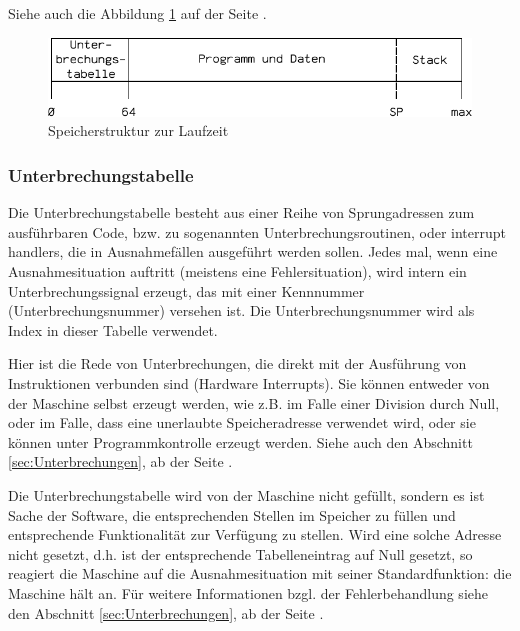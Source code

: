 Siehe auch die Abbildung \ref{fig:Speicherstruktur} auf der Seite
\pageref{fig:Speicherstruktur}.

\begin{figure}[htp]
 \centering
 \includegraphics{./img/UMach-Speicherstruktur}
 \caption[Speicherstruktur]{Speicherstruktur zur Laufzeit}
 \label{fig:Speicherstruktur}
\end{figure}



\subsubsection{Unterbrechungstabelle}
\label{subsubsec:Unterbrechungstabelle}

Die Unterbrechungstabelle besteht aus einer Reihe von Sprungadressen zum
ausführbaren Code, bzw. zu sogenannten Unterbrechungsroutinen, oder \glqq
interrupt handlers\grqq, die in Ausnahmefällen ausgeführt werden sollen. Jedes
mal, wenn eine Ausnahmesituation auftritt (meistens eine Fehlersituation), wird
intern ein Unterbrechungssignal erzeugt, das mit einer Kennnummer
(Unterbrechungsnummer) versehen ist. Die Unterbrechungsnummer wird als Index in
dieser Tabelle verwendet.

Hier ist die Rede von Unterbrechungen, die direkt mit der Ausführung von
Instruktionen verbunden sind (Hardware Interrupts). Sie können entweder von der
Maschine selbst erzeugt werden, wie z.B. im Falle einer Division durch Null,
oder im Falle, dass eine unerlaubte Speicheradresse verwendet wird, oder sie
können unter Programmkontrolle erzeugt werden. Siehe auch den Abschnitt
\ref{sec:Unterbrechungen}, ab der Seite \pageref{sec:Unterbrechungen}.


Die Unterbrechungstabelle wird von der Maschine nicht gefüllt, sondern es ist
Sache der Software, die entsprechenden Stellen im Speicher zu füllen und
entsprechende Funktionalität zur Verfügung zu stellen. Wird eine solche Adresse
nicht gesetzt, d.h. ist der entsprechende Tabelleneintrag auf Null gesetzt, so
reagiert die Maschine auf die Ausnahmesituation mit seiner Standardfunktion: die
Maschine hält an. Für weitere Informationen bzgl. der Fehlerbehandlung siehe den
Abschnitt \ref{sec:Unterbrechungen}, ab der Seite \pageref{sec:Unterbrechungen}.


